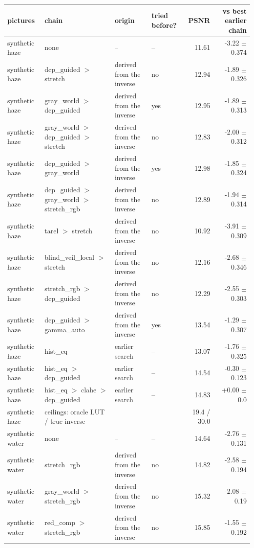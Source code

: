 \begin{tabular}{llllrr}
\toprule
pictures & chain & origin & tried before? & PSNR & vs best earlier chain \\
\midrule
synthetic haze & none & -- & -- & 11.61 & -3.22 $\pm$ 0.374 \\
synthetic haze & dcp\_guided $>$ stretch & derived from the inverse & no & 12.94 & -1.89 $\pm$ 0.326 \\
synthetic haze & gray\_world $>$ dcp\_guided & derived from the inverse & yes & 12.95 & -1.89 $\pm$ 0.313 \\
synthetic haze & gray\_world $>$ dcp\_guided $>$ stretch & derived from the inverse & no & 12.83 & -2.00 $\pm$ 0.312 \\
synthetic haze & dcp\_guided $>$ gray\_world & derived from the inverse & yes & 12.98 & -1.85 $\pm$ 0.324 \\
synthetic haze & dcp\_guided $>$ gray\_world $>$ stretch\_rgb & derived from the inverse & no & 12.89 & -1.94 $\pm$ 0.314 \\
synthetic haze & tarel $>$ stretch & derived from the inverse & no & 10.92 & -3.91 $\pm$ 0.309 \\
synthetic haze & blind\_veil\_local $>$ stretch & derived from the inverse & no & 12.16 & -2.68 $\pm$ 0.346 \\
synthetic haze & stretch\_rgb $>$ dcp\_guided & derived from the inverse & no & 12.29 & -2.55 $\pm$ 0.303 \\
synthetic haze & dcp\_guided $>$ gamma\_auto & derived from the inverse & yes & 13.54 & -1.29 $\pm$ 0.307 \\
synthetic haze & hist\_eq & earlier search & -- & 13.07 & -1.76 $\pm$ 0.325 \\
synthetic haze & hist\_eq $>$ dcp\_guided & earlier search & -- & 14.54 & -0.30 $\pm$ 0.123 \\
synthetic haze & hist\_eq $>$ clahe $>$ dcp\_guided & earlier search & -- & 14.83 & +0.00 $\pm$ 0.0 \\
synthetic haze & ceilings: oracle LUT / true inverse &  &  & 19.4 / 30.0 &  \\
synthetic water & none & -- & -- & 14.64 & -2.76 $\pm$ 0.131 \\
synthetic water & stretch\_rgb & derived from the inverse & no & 14.82 & -2.58 $\pm$ 0.194 \\
synthetic water & gray\_world $>$ stretch\_rgb & derived from the inverse & no & 15.32 & -2.08 $\pm$ 0.19 \\
synthetic water & red\_comp $>$ stretch\_rgb & derived from the inverse & no & 15.85 & -1.55 $\pm$ 0.192 \\

\end{tabular}
